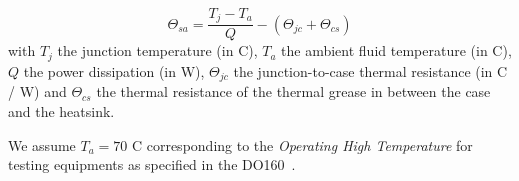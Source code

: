 \documentclass[main.tex]{subfiles}
\begin{document}
\begin{equation}
    \label{eq_stateOfTheArt_therman_resistance}
    \Theta_{sa} = \dfrac{T_j - T_a}{Q} - (\Theta_{jc} + \Theta_{cs})
\end{equation}
with $T_j$ the junction temperature (in \degree C), $T_a$ the ambient fluid temperature (in \degree C), $Q$ the power dissipation (in W), $\Theta_{jc}$ the junction-to-case thermal resistance (in \degree C / W) and $\Theta_{cs}$ the thermal resistance of the thermal grease in between the case and the heatsink. 

We assume $T_a = 70 $ \degree C corresponding to the \emph{Operating High Temperature} for testing equipments as specified in the DO160~\cite{do160}.
\end{document}

